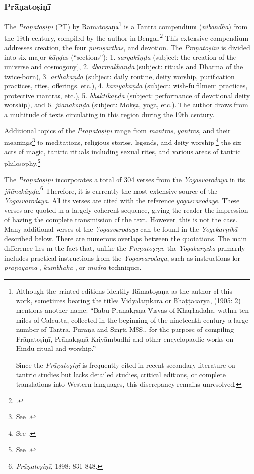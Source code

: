 \subsubsection{Prāṇatoṣiṇī}
\label{tosi}
The \textit{Prāṇatoṣiṇī} (PT) by Rāmatoṣaṇa\footnote{Although the printed editions identify Rāmatoṣaṇa as the author of this work, sometimes bearing the titles Vidyālaṃkāra or Bhaṭṭācārya, \citeauthor{shastri1905} (1905: 2) mentions another name: ``Babu Prāṇakṛṣṇa Visvās of Khaṛhadaha, within ten miles of Calcutta, collected in the beginning of the nineteenth century a large number of Tantra, Purāṇa and Smṛti MSS., for the purpose of compiling Prāṇatoṣiṇī, Prāṇakṛṣṇā Kriyāmbudhi and other encyclopaedic works on Hindu ritual and worship.''

Since the \textit{Prāṇatoṣiṇī} is frequently cited in recent secondary literature on tantric studies but lacks detailed studies, critical editions, or complete translations into Western languages, this discrepancy remains unresolved.} is a Tantra compendium (\textit{nibandha}) from the 19th century, compiled by the author in Bengal.\footnote{\cite{ramatosana}.} This extensive compendium addresses creation, the four \textit{puruṣārthas}, and devotion. The \textit{Prāṇatoṣiṇī} is divided into six major \textit{kāṇḍa}s (``sections''): 1. \textit{sargakāṇḍa} (subject: the creation of the universe and cosmogony), 2. \textit{dharmakhaṇḍa} (subject: rituals and Dharma of the twice-born), 3. \textit{arthakāṇḍa} (subject: daily routine, deity worship, purification practices, rites, offerings, etc.), 4. \textit{kāmyakāṇḍa} (subject: wish-fulfilment practices, protective mantras, etc.), 5. \textit{bhaktikāṇḍa} (subject: performance of devotional deity worship), and 6. \textit{jñānakāṇḍa} (subject: Mokṣa, yoga, etc.). The author draws from a multitude of texts circulating in this region during the 19th century.

Additional topics of the \textit{Prāṇatoṣiṇī} range from \textit{mantras}, \textit{yantras}, and their meanings\footnote{See \citeauthor[2010: 69-70]{slouber2010}.} to meditations, religious stories, legends, and deity worship,\footnote{See \citeauthor[1997: 149-150]{kinsley1997}.} the six acts of magic, tantric rituals including sexual rites, and various areas of tantric philosophy.\footnote{See \citeauthor[2010: 100]{urban2010}.}

The \textit{Prāṇatoṣiṇī} incorporates a total of 304 verses from the \textit{Yogasvarodaya} in its \textit{jñānakāṇḍa}.\footnote{\emph{Prāṇatoṣiṇī}, 1898: 831-848.} Therefore, it is currently the most extensive source of the \emph{Yogasvarodaya}. All its verses are cited with the reference \textit{yogasvarodaye}. These verses are quoted in a largely coherent sequence, giving the reader the impression of having the complete transmission of the text. However, this is not the case. Many additional verses of the \emph{Yogasvarodaya} can be found in the \emph{Yogakarṇikā} described below. There are numerous overlaps between the quotations. The main difference lies in the fact that, unlike the \textit{Prāṇatoṣiṇī}, the \emph{Yogakarṇikā} primarily includes practical instructions from the \textit{Yogasvarodaya}, such as instructions for \textit{prāṇāyāma}-, \textit{kumbhaka}-, or \textit{mudrā} techniques.

